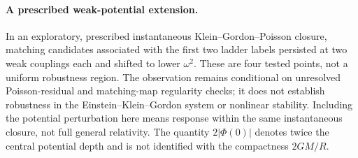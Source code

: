 \paragraph{A prescribed weak-potential extension.}
In an exploratory, prescribed instantaneous Klein--Gordon--Poisson closure,
matching candidates associated with the first two ladder labels persisted
at two weak couplings each and shifted to lower $\omega^2$. These are four
tested points, not a uniform robustness region. The observation remains
conditional on unresolved Poisson-residual and matching-map regularity
checks; it does not establish robustness in the Einstein--Klein--Gordon
system or nonlinear stability. Including the potential perturbation here
means response within the same instantaneous closure, not full general
relativity. The quantity $2|\Phi(0)|$ denotes twice the central potential
depth and is not identified with the compactness $2GM/R$.
